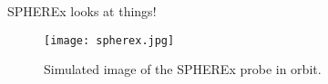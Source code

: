 SPHEREx looks at things! \cite{2014arXiv1412.4872D}

\begin{figure}[th]
	\centering
	\texttt{[image: spherex.jpg]}
	\caption[SPHEREx]{Simulated image of the SPHEREx probe in orbit.}
	\label{fig:spherex}
\end{figure}
